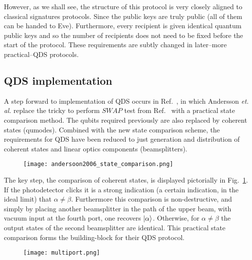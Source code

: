 However, as we shall see, the structure of this protocol is very closely aligned to classical signatures protocols. Since the public keys are truly public (all of them can be handed to Eve). Furthermore, every recipient is given identical quantum public keys and so the number of recipients does not need to be fixed before the start of the protocol. These requirements are subtly changed in later--more practical--QDS protocols. 


\subsection*{QDS implementation}
A step forward to implementation of QDS occurs in Ref.~\cite{Andersson2006}, in which Andersson \emph{et. al.} replace the tricky to perform $SWAP$ test from Ref.~\cite{Gottesman2001} with a practical state comparison method. The qubits required previously are also replaced by coherent states (qumodes). Combined with the new state comparison scheme, the requirements for QDS have been reduced to just generation and distribution of coherent states and linear optics components (beamsplitters).

\begin{figure}[htp]
\centering
\texttt{[image: andersoon2006\_state\_comparison.png]}
\caption{\label{fig:andersson2006_state_comparison}}
\end{figure}

The key step, the comparison of coherent states, is displayed pictorially in Fig.~\ref{fig:andersson2006_state_comparison}. If the photodetector clicks it is a strong indication (a certain indication, in the ideal limit) that $\alpha \ne \beta$. Furthermore this comparison is non-destructive, and simply by placing another beamsplitter in the path of the upper beam, with vacuum input at the fourth port, one recovers $\ket{\alpha}$. Otherwise, for $\alpha \ne \beta$ the output states of the second beamsplitter are identical. This practical state comparison forms the building-block for their QDS protocol. 

\begin{figure}[htp]
\centering
\texttt{[image: multiport.png]}
\caption{\label{fig:andersson2006_multiport}}
\end{figure}


